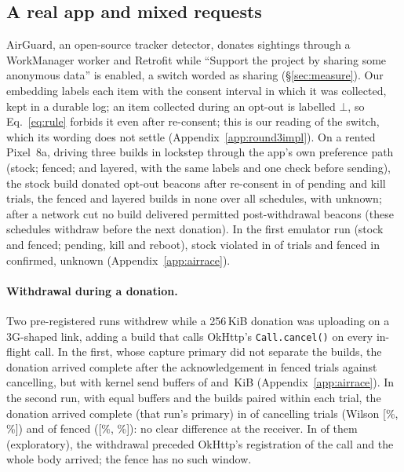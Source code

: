 \subsection{A real app and mixed requests}
\label{sec:eval-realapp}
AirGuard, an open-source tracker detector, donates sightings through a WorkManager worker and Retrofit while ``Support
the project by sharing some anonymous data'' is enabled, a switch worded as sharing (\S\ref{sec:measure}). Our embedding
labels each item with the consent interval in which it was collected, kept in a durable log; an item collected during an
opt-out is labelled $\bot$, so Eq.~\ref{eq:rule} forbids it even after re-consent; this is our reading of the switch,
which its wording does not settle (Appendix~\ref{app:round3impl}). On a rented Pixel~8a, driving three builds in lockstep
through the app's own preference path (stock; fenced; and layered, with the same labels and one check before sending),
the stock build donated opt-out beacons after re-consent in \dfAirStockPK{} of \dfAirPKN{} pending and kill trials, the
fenced and layered builds in none over all schedules, with \dfAirUnknown{} unknown; after a network
cut no build delivered permitted post-withdrawal beacons (these schedules withdraw before the next donation). In the first emulator run (stock and fenced; pending, kill and reboot), stock violated in
\airStockViol{} of \airN{} trials and fenced in \airFenceViol{} confirmed, \airFenceUnknownV{} unknown (Appendix~\ref{app:airrace}).

\paragraph{Withdrawal during a donation.} Two pre-registered runs withdrew while a 256\,KiB donation was uploading on a
3G-shaped link, adding a build that calls OkHttp's \texttt{Call.cancel()} on every in-flight call. In the first, whose
capture primary did not separate the builds, the donation arrived complete after the acknowledgement in \gaFenceRx{}
fenced trials against \gaCancelRx{} cancelling, but with kernel send buffers of \gbKernSmallKib{} and
\gbKernDefKib{}\,KiB (Appendix~\ref{app:airrace}). In the second run, with equal buffers and the builds paired within
each trial, the donation arrived complete (that run's primary) in \gbSixteenRx{} of \gbSixteenN{} cancelling trials (Wilson
[\gbSixteenLo{}\%, \gbSixteenHi{}\%]) and \gbFenceRx{} of \gbFenceN{} fenced ([\gbFenceLo{}\%, \gbFenceHi{}\%]): no clear
difference at the receiver. In \gbNoCallRx{} of them (exploratory), the withdrawal preceded OkHttp's registration of the
call and the whole body arrived; the fence has no such window.


